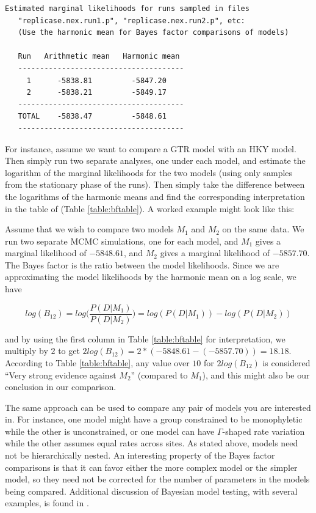 \documentclass[12pt]{book}
\begin{document}
\begin{singlespacing}
\footnotesize
\begin{verbatim}
Estimated marginal likelihoods for runs sampled in files
   "replicase.nex.run1.p", "replicase.nex.run2.p", etc:
   (Use the harmonic mean for Bayes factor comparisons of models)

   Run   Arithmetic mean   Harmonic mean
   --------------------------------------
     1      -5838.81         -5847.20
     2      -5838.21         -5849.17
   --------------------------------------
   TOTAL    -5838.47         -5848.61
   --------------------------------------
\end{verbatim}
\normalsize
\end{singlespacing}

For instance, assume we want to compare a GTR model with an HKY model. Then simply run two separate
analyses, one under each model, and estimate the logarithm of the marginal likelihoods for the two
models (using only samples from the stationary phase of the runs). Then simply take the difference
between the logarithms of the harmonic means and find the corresponding interpretation in the table
of \citet{kass95} (Table \ref{table:bftable}). A worked example might look like this:

Assume that we wish to compare two models $M_{1}$ and $M_{2}$ on the same data. We run two separate
MCMC simulations, one for each model, and $M_{1}$ gives a marginal likelihood of $-5848.61$, and
$M_{2}$ gives a marginal likelihood of $-5857.70$.  The Bayes factor is the ratio between the model
likelihoods. Since we are approximating the model likelihoods by the harmonic mean on a log scale,
we have 

$$
log (B_{12}) =
log \Big(\frac{P(D|M_{1})}{P(D|M_{2})}\Big) = log(P(D|M_{1})) - log(P(D|M_{2}))
$$

and by using the first column in Table \ref{table:bftable} for interpretation, we multiply by $2$
to get $2 log(B_{12}) = 2 * (-5848.61 - (-5857.70)) = 18.18$. According to Table
\ref{table:bftable}, any value over $10$ for $2 log(B_{12})$ is considered ``Very strong evidence
against $M_{2}$'' (compared to $M_{1}$), and this might also be our conclusion in our comparison.

The same approach can be used to compare any pair of models you are interested in. For instance,
one model might have a group constrained to be monophyletic while the other is unconstrained, or
one model can have $\Gamma$-shaped rate variation while the other assumes equal rates across sites.
As stated above, models need not be hierarchically nested.  An interesting property of the Bayes
factor comparisons is that it can favor either the more complex model or the simpler model, so they
need not be corrected for the number of parameters in the models being compared. Additional
discussion of Bayesian model testing, with several examples, is found in \citet{nylander04}.
\end{document}
